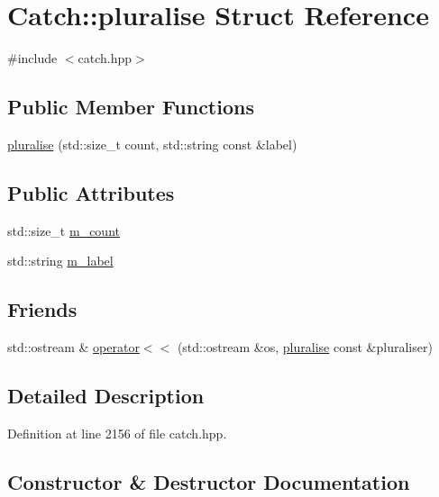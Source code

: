 \hypertarget{struct_catch_1_1pluralise}{}\section{Catch\+:\+:pluralise Struct Reference}
\label{struct_catch_1_1pluralise}


{\ttfamily \#include $<$catch.\+hpp$>$}

\subsection*{Public Member Functions}
\begin{DoxyCompactItemize}
\item 
\mbox{\hyperlink{struct_catch_1_1pluralise_a5c55e22de2416cfe416edf715c6b9234}{pluralise}} (std\+::size\+\_\+t count, std\+::string const \&label)
\end{DoxyCompactItemize}
\subsection*{Public Attributes}
\begin{DoxyCompactItemize}
\item 
std\+::size\+\_\+t \mbox{\hyperlink{struct_catch_1_1pluralise_a4dce2fa13ec6f00fac09b2418265441e}{m\+\_\+count}}
\item 
std\+::string \mbox{\hyperlink{struct_catch_1_1pluralise_a8849cbdd3f11ebe7747597c8644e8793}{m\+\_\+label}}
\end{DoxyCompactItemize}
\subsection*{Friends}
\begin{DoxyCompactItemize}
\item 
std\+::ostream \& \mbox{\hyperlink{struct_catch_1_1pluralise_aa7dac6b165514c1f85e0695d678fdef5}{operator$<$$<$}} (std\+::ostream \&os, \mbox{\hyperlink{struct_catch_1_1pluralise}{pluralise}} const \&pluraliser)
\end{DoxyCompactItemize}


\subsection{Detailed Description}


Definition at line 2156 of file catch.\+hpp.



\subsection{Constructor \& Destructor Documentation}
\mbox{\label{struct_catch_1_1pluralise_a5c55e22de2416cfe416edf715c6b9234}} 
